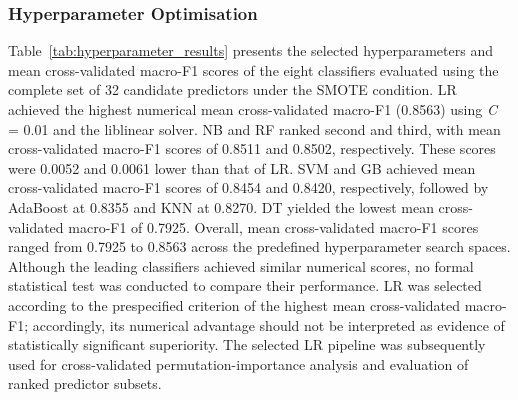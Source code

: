 \documentclass[jtaer,article,submit,moreauthors]{Definitions/mdpi}
\begin{document}
\subsubsection{Hyperparameter Optimisation}
Table~\ref{tab:hyperparameter_results} presents the selected
hyperparameters and mean cross-validated macro-F1 scores of the eight
classifiers evaluated using the complete set of 32 candidate predictors
under the SMOTE condition.
LR achieved the highest numerical mean cross-validated macro-F1
(0.8563) using \textit{C} = 0.01 and the liblinear solver. NB and RF
ranked second and third, with mean cross-validated macro-F1 scores of
0.8511 and 0.8502, respectively. These scores were 0.0052 and 0.0061
lower than that of LR. SVM and GB achieved mean cross-validated
macro-F1 scores of 0.8454 and 0.8420, respectively, followed by
AdaBoost at 0.8355 and KNN at 0.8270. DT yielded the lowest mean
cross-validated macro-F1 of 0.7925. Overall, mean cross-validated
macro-F1 scores ranged from 0.7925 to 0.8563 across the predefined
hyperparameter search spaces.
Although the leading classifiers achieved similar numerical scores,
no formal statistical test was conducted to compare their performance.
LR was selected according to the prespecified criterion of the highest
mean cross-validated macro-F1; accordingly, its numerical advantage
should not be interpreted as evidence of statistically significant
superiority. The selected LR pipeline was subsequently used for
cross-validated permutation-importance analysis and evaluation of ranked
predictor subsets.
\end{document}
